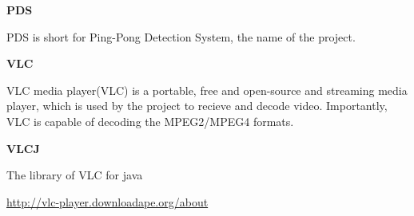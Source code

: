 \documentclass[11pt]{report}
\newlength{\glosslen}
\newcommand{\gloss}[2]{
  \vspace{3mm}

  \noindent\textbf{#1}\vspace{1mm}

  \hspace{5mm}\parbox{\glosslen}{#2}}
\begin{document}
\gloss{PDS}{PDS is short for Ping-Pong Detection System, the name of the project.}

\gloss{VLC}{VLC media player(VLC) is a portable, free and open-source and streaming media player, which is used by the project to recieve and decode video.  Importantly, VLC is capable of decoding the MPEG2/MPEG4 formats.}

\gloss{VLCJ}{The library of VLC for java}

\begin{thebibliography}{1}

 \url {http://vlc-player.downloadape.org/about}
  
\end{thebibliography}
\end{document}
